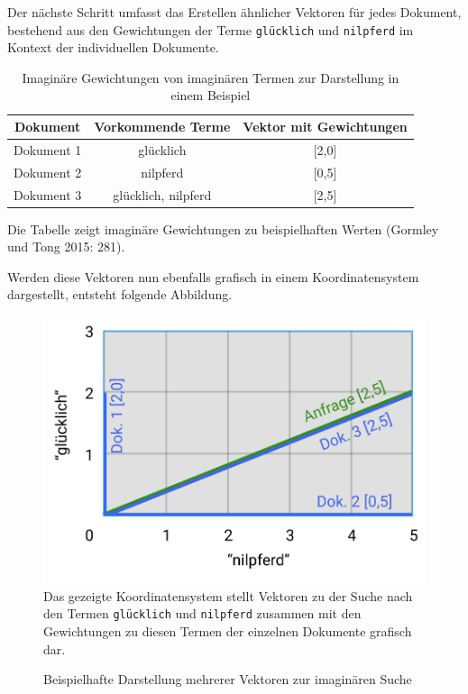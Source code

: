 \documentclass[a4paper]{scrartcl}
\begin{document}
Der nächste Schritt umfasst das Erstellen ähnlicher Vektoren für jedes Dokument, bestehend aus den Gewichtungen der Terme \texttt{glücklich} und \texttt{nilpferd} im Kontext der individuellen Dokumente. \\

\begin{table}[htb]
	\centering
	\caption{Imaginäre Gewichtungen von imaginären Termen zur Darstellung in einem Beispiel}
	\begin{center}
		
		\begin{tabular}{| c | c | c |}
			\hline
			Dokument & Vorkommende Terme & Vektor mit Gewichtungen \\ [0.5ex]
			\hline \hline
			Dokument 1 & glücklich & [2,0] \\
			\hline
			Dokument 2 & nilpferd & [0,5] \\
			\hline
			Dokument 3 & glücklich, nilpferd & [2,5] \\
			\hline
		\end{tabular}
	\end{center}
	Die Tabelle zeigt imaginäre Gewichtungen zu beispielhaften Werten (Gormley und Tong 2015: 281).
\end{table} 

Werden diese Vektoren nun ebenfalls grafisch in einem Koordinatensystem dargestellt, entsteht folgende Abbildung.

\begin{figure}[h!]
	\centering
	\caption{Beispielhafte Darstellung mehrerer Vektoren zur imaginären Suche}
	\includegraphics[scale=0.35]{assets/Diagram_2} \\
	Das gezeigte Koordinatensystem stellt Vektoren zu der Suche nach den Termen \texttt{glücklich} und \texttt{nilpferd} zusammen mit den Gewichtungen zu diesen Termen der einzelnen Dokumente grafisch dar.
\end{figure}
\end{document}
